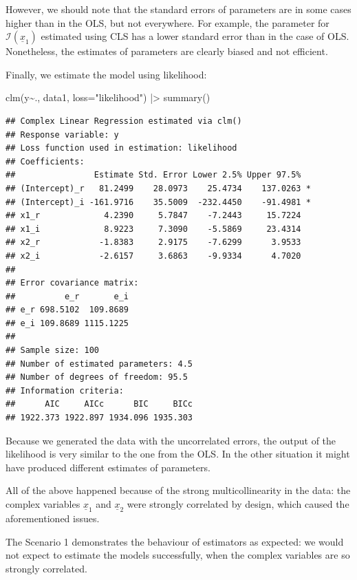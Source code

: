 \documentclass[
]{book}
\newenvironment{Shaded}{\begin{snugshade}}{\end{snugshade}}
\newcommand{\AttributeTok}[1]{\textcolor[rgb]{0.77,0.63,0.00}{#1}}
\newcommand{\FunctionTok}[1]{\textcolor[rgb]{0.00,0.00,0.00}{#1}}
\newcommand{\NormalTok}[1]{#1}
\newcommand{\SpecialCharTok}[1]{\textcolor[rgb]{0.00,0.00,0.00}{#1}}
\newcommand{\StringTok}[1]{\textcolor[rgb]{0.31,0.60,0.02}{#1}}
\begin{document}
However, we should note that the standard errors of parameters are in some cases higher than in the OLS, but not everywhere. For example, the parameter for \(\mathcal{I}\left(\underline{x}_{1}\right)\) estimated using CLS has a lower standard error than in the case of OLS. Nonetheless, the estimates of parameters are clearly biased and not efficient.

Finally, we estimate the model using likelihood:

\begin{Shaded}
\begin{Highlighting}[]
\FunctionTok{clm}\NormalTok{(y}\SpecialCharTok{\textasciitilde{}}\NormalTok{., data1, }\AttributeTok{loss=}\StringTok{"likelihood"}\NormalTok{) }\SpecialCharTok{|\textgreater{}}
    \FunctionTok{summary}\NormalTok{()}
\end{Highlighting}
\end{Shaded}

\begin{verbatim}
## Complex Linear Regression estimated via clm()
## Response variable: y
## Loss function used in estimation: likelihood
## Coefficients:
##                Estimate Std. Error Lower 2.5% Upper 97.5%  
## (Intercept)_r   81.2499    28.0973    25.4734    137.0263 *
## (Intercept)_i -161.9716    35.5009  -232.4450    -91.4981 *
## x1_r             4.2390     5.7847    -7.2443     15.7224  
## x1_i             8.9223     7.3090    -5.5869     23.4314  
## x2_r            -1.8383     2.9175    -7.6299      3.9533  
## x2_i            -2.6157     3.6863    -9.9334      4.7020  
## 
## Error covariance matrix:
##          e_r       e_i
## e_r 698.5102  109.8689
## e_i 109.8689 1115.1225
## 
## Sample size: 100
## Number of estimated parameters: 4.5
## Number of degrees of freedom: 95.5
## Information criteria:
##      AIC     AICc      BIC     BICc 
## 1922.373 1922.897 1934.096 1935.303
\end{verbatim}

Because we generated the data with the uncorrelated errors, the output of the likelihood is very similar to the one from the OLS. In the other situation it might have produced different estimates of parameters.

All of the above happened because of the strong multicollinearity in the data: the complex variables \(\underline{x}_{1}\) and \(\underline{x}_{2}\) were strongly correlated by design, which caused the aforementioned issues.

The Scenario 1 demonstrates the behaviour of estimators as expected: we would not expect to estimate the models successfully, when the complex variables are so strongly correlated.
\end{document}
